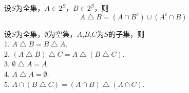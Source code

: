       \begin{Thm}
        设$S$为全集，$A\in 2^S$，$B\in 2^S$，则
        \begin{equation*}
          A \bigtriangleup B = (A \cap B^c)\cup (A^c \cap B)
        \end{equation*}
      \end{Thm}
  \begin{Thm}
设$S$为全集，$\emptyset$为空集，$A$,$B$,$C$为$S$的子集，则\\
1. $A \bigtriangleup B = B \bigtriangleup A$.\\
2. $(A \bigtriangleup B) \bigtriangleup C = A \bigtriangleup (B \bigtriangleup C)$.\\
3. $\emptyset \bigtriangleup A = A$.\\
4. $A \bigtriangleup A = \emptyset$.\\
5. $A \cap (B \bigtriangleup C) = (A \cap B) \bigtriangleup (A \cap C)$.\\ 
  \end{Thm}

